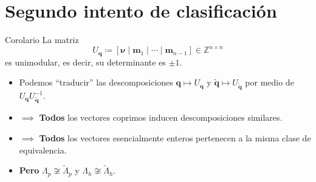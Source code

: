 \documentclass[aspectratio=169,professionalfonts]{beamer}
\newcommand{\Z}{\mathbb{Z}}
\renewcommand{\vec}[1]{\boldsymbol{#1}}
\newcommand{\inv}[1]{#1^{-1}}
\newcommand{\tvec}[1]{\vec{\tilde{#1}}}
\begin{document}
\section*{Segundo intento de clasificación}
\begin{frame}
	\begin{block}{Corolario}
		La matriz
		\begin{equation*}
			U_{\vec{q}} \coloneq [ \vec{\nu} \mid \vec{m}_1 \mid \cdots \mid \vec{m}_{n-1} ] \in \Z^{n \times n}
		\end{equation*}
		es unimodular, es decir, su determinante es $\pm 1$.
	\end{block}
	\begin{itemize}
		\item Podemos ``traducir'' las descomposiciones $\vec{q} \mapsto
			U_{\vec{q}}$ y $\tvec{q} \mapsto U_{\tvec{q}}$ por medio de
			$U_{\vec{q}}\inv{U}_{\tvec{q}}$.
		\item $\implies$ \textbf{Todos} los vectores coprimos
			inducen descomposiciones similares.
		\item $\implies$ \textbf{Todos} los vectores esencialmente enteros
			pertenecen a la misma clase de equivalencia.
		\item \textbf{Pero} $\Lambda_p \not\cong \tilde{\Lambda}_p$ y $\Lambda_h
			\not\cong \tilde{\Lambda}_h$.
	\end{itemize}
\end{frame}

\end{document}
